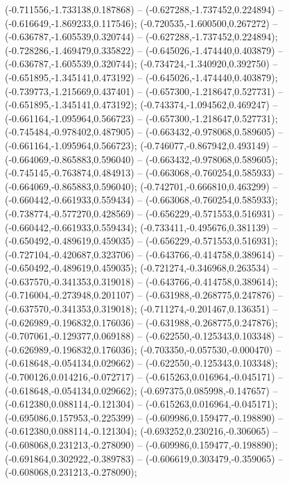  (-0.711556,-1.733138,0.187868) -- (-0.627288,-1.737452,0.224894) -- (-0.616649,-1.869233,0.117546);
 (-0.720535,-1.600500,0.267272) -- (-0.636787,-1.605539,0.320744) -- (-0.627288,-1.737452,0.224894);
 (-0.728286,-1.469479,0.335822) -- (-0.645026,-1.474440,0.403879) -- (-0.636787,-1.605539,0.320744);
 (-0.734724,-1.340920,0.392750) -- (-0.651895,-1.345141,0.473192) -- (-0.645026,-1.474440,0.403879);
 (-0.739773,-1.215669,0.437401) -- (-0.657300,-1.218647,0.527731) -- (-0.651895,-1.345141,0.473192);
 (-0.743374,-1.094562,0.469247) -- (-0.661164,-1.095964,0.566723) -- (-0.657300,-1.218647,0.527731);
 (-0.745484,-0.978402,0.487905) -- (-0.663432,-0.978068,0.589605) -- (-0.661164,-1.095964,0.566723);
 (-0.746077,-0.867942,0.493149) -- (-0.664069,-0.865883,0.596040) -- (-0.663432,-0.978068,0.589605);
 (-0.745145,-0.763874,0.484913) -- (-0.663068,-0.760254,0.585933) -- (-0.664069,-0.865883,0.596040);
 (-0.742701,-0.666810,0.463299) -- (-0.660442,-0.661933,0.559434) -- (-0.663068,-0.760254,0.585933);
 (-0.738774,-0.577270,0.428569) -- (-0.656229,-0.571553,0.516931) -- (-0.660442,-0.661933,0.559434);
 (-0.733411,-0.495676,0.381139) -- (-0.650492,-0.489619,0.459035) -- (-0.656229,-0.571553,0.516931);
 (-0.727104,-0.420687,0.323706) -- (-0.643766,-0.414758,0.389614) -- (-0.650492,-0.489619,0.459035);
 (-0.721274,-0.346968,0.263534) -- (-0.637570,-0.341353,0.319018) -- (-0.643766,-0.414758,0.389614);
 (-0.716004,-0.273948,0.201107) -- (-0.631988,-0.268775,0.247876) -- (-0.637570,-0.341353,0.319018);
 (-0.711274,-0.201467,0.136351) -- (-0.626989,-0.196832,0.176036) -- (-0.631988,-0.268775,0.247876);
 (-0.707061,-0.129377,0.069188) -- (-0.622550,-0.125343,0.103348) -- (-0.626989,-0.196832,0.176036);
 (-0.703350,-0.057530,-0.000470) -- (-0.618648,-0.054134,0.029662) -- (-0.622550,-0.125343,0.103348);
 (-0.700126,0.014216,-0.072717) -- (-0.615263,0.016964,-0.045171) -- (-0.618648,-0.054134,0.029662);
 (-0.697375,0.085998,-0.147657) -- (-0.612380,0.088114,-0.121304) -- (-0.615263,0.016964,-0.045171);
 (-0.695086,0.157953,-0.225399) -- (-0.609986,0.159477,-0.198890) -- (-0.612380,0.088114,-0.121304);
 (-0.693252,0.230216,-0.306065) -- (-0.608068,0.231213,-0.278090) -- (-0.609986,0.159477,-0.198890);
 (-0.691864,0.302922,-0.389783) -- (-0.606619,0.303479,-0.359065) -- (-0.608068,0.231213,-0.278090);

